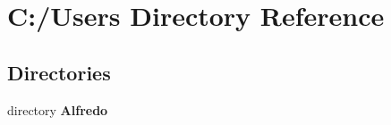\section{C\+:/\+Users Directory Reference}
\label{dir_d522931ffa1371640980b621734a4381}
\subsection*{Directories}
\begin{DoxyCompactItemize}
\item 
directory {\bf Alfredo}
\end{DoxyCompactItemize}
